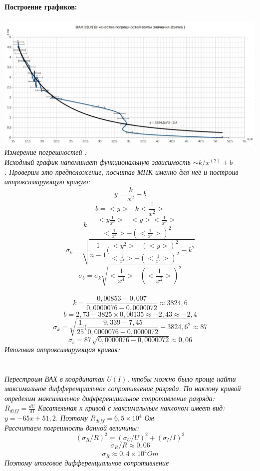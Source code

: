 \documentclass[11pt]{article}
\begin{document}
\ \\
\textbf{Построение графиков:}\\
\ \\
\includegraphics[width = 19cm]{vah}\\
\em Измерение погрешностей \em: \\
Исходный график напоминает функциональную зависимость $\sim k/x^(2) + b$\\. Проверим это предположение, посчитав МНК именно для неё и построив аппроксимирующую кривую:\\
$$ y = \frac{k}{x^2} + b $$
$$ b = <y> - k<\frac{1}{x^2}> $$
$$ k = \frac{<y\frac{1}{x^2}> - <y><\frac{1}{x^2}>}{<\frac{1}{x^4}> - (<\frac{1}{x^2}>)^2} $$
$$ \sigma_{k} = \sqrt{\frac{1}{n-1}(\frac{<y^2> - (<y>)^2}{<\frac{1}{x^4}> - (<\frac{1}{x^2}>)^2} - k^2} $$
$$ \sigma_{b} = \sigma_{k}\sqrt{<\frac{1}{x^4}> - (<\frac{1}{x^2}>)^2} $$
\\
$$  k = \frac{0,00853 - 0,007}{0,0000076 - 0,0000072} \approx 3824,6  $$
$$ b = 2,73 - 3825\times 0,00135 \approx -2,43 \approx -2,4 $$
$$ \sigma_{k} = \sqrt{\frac{1}{25}(\frac{9,339 - 7,45}{0,0000076 - 0,0000072} - 3824,6^2} \approx 87 $$
$$ \sigma_{b} = 87\sqrt{0,0000076 - 0,0000072} \approx 0,06$$
Итоговая аппроксимирующая кривая:\\
\\
\\
Перестроим ВАХ в координатах $U(I)$, чтобы можно было проще найти максимальное дифференциальное сопротивление разряда.
По наклону кривой определим максимальное дифференциальное сопротивление разряда:\\
$ R_{diff} = \frac{dU}{dI}$
Касательная к кривой с максимальным наклоном имеет вид: $ y = -65x + 51,2$. Поэтому $R_{diff} = 6,5 \times 10^4$ Ом\\
Рассчитаем погрешность данной величины:\\
$$(\sigma_{R}/R)^2 = (\sigma_{U}/U)^2 + (\sigma_{I}/I)^2$$
$$ \sigma_{R}/R \approx 0,06 $$
$$ \sigma_{R} \approx 0,4 \times 10^4 Om $$
Поэтому итоговое дифференциальное сопротивление \\
\end{document}
